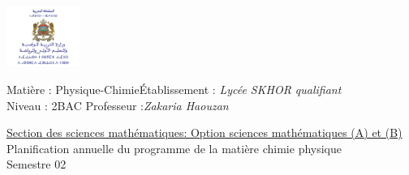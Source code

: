 \documentclass[12pt]{article}
\newcommand\headerMe[2]{\noindent{}#1\hfill#2}
\begin{document}
\begin{center}
\includegraphics[width = 0.18\textwidth]{./img/logoMin.png}
\vspace{-3cm}
\end{center}
\headerMe{Matière : Physique-Chimie}{Établissement : \emph{Lycée SKHOR qualifiant}}\\
\headerMe{ Niveau : 2BAC }{  Professeur :\emph{Zakaria Haouzan}}\\

\begin{center}
	\vspace{0.5cm}
\underline{Section des sciences mathématiques: Option sciences mathématiques (A) et (B)}
\\
\hrulefill
\Large{Planification annuelle
du programme de la matière chimie physique}
\hrulefill\\
\Large{Semestre 02}
\hrulefill\\

\end{center}
\end{document}

